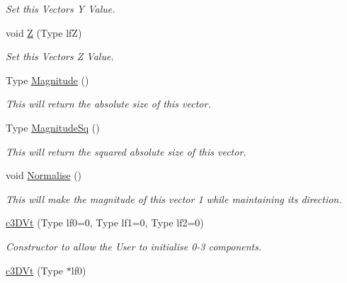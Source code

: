 \begin{DoxyCompactItemize}
\begin{DoxyCompactList}\small\item\em Set this Vectors Y Value. \end{DoxyCompactList}\item 
\hypertarget{classc3_d_vt_a23ad6c598963c1891fad05c6687d3d76}{
void \hyperlink{classc3_d_vt_a23ad6c598963c1891fad05c6687d3d76}{Z} (Type lfZ)}
\label{classc3_d_vt_a23ad6c598963c1891fad05c6687d3d76}

\begin{DoxyCompactList}\small\item\em Set this Vectors Z Value. \end{DoxyCompactList}\item 
\hypertarget{classc3_d_vt_af8df11dbf7dfdf2d5f9379febed52183}{
Type \hyperlink{classc3_d_vt_af8df11dbf7dfdf2d5f9379febed52183}{Magnitude} ()}
\label{classc3_d_vt_af8df11dbf7dfdf2d5f9379febed52183}

\begin{DoxyCompactList}\small\item\em This will return the absolute size of this vector. \end{DoxyCompactList}\item 
\hypertarget{classc3_d_vt_a400d4c58994c0bea04edd265d89dbff9}{
Type \hyperlink{classc3_d_vt_a400d4c58994c0bea04edd265d89dbff9}{MagnitudeSq} ()}
\label{classc3_d_vt_a400d4c58994c0bea04edd265d89dbff9}

\begin{DoxyCompactList}\small\item\em This will return the squared absolute size of this vector. \end{DoxyCompactList}\item 
\hypertarget{classc3_d_vt_ab0596e7c234a2737701a3be5ed985205}{
void \hyperlink{classc3_d_vt_ab0596e7c234a2737701a3be5ed985205}{Normalise} ()}
\label{classc3_d_vt_ab0596e7c234a2737701a3be5ed985205}

\begin{DoxyCompactList}\small\item\em This will make the magnitude of this vector 1 while maintaining its direction. \end{DoxyCompactList}\item 
\hypertarget{classc3_d_vt_ac477f1d395ac545f8e2d2563cd1b4f47}{
\hyperlink{classc3_d_vt_ac477f1d395ac545f8e2d2563cd1b4f47}{c3DVt} (Type lf0=0, Type lf1=0, Type lf2=0)}
\label{classc3_d_vt_ac477f1d395ac545f8e2d2563cd1b4f47}

\begin{DoxyCompactList}\small\item\em Constructor to allow the User to initialise 0-\/3 components. \end{DoxyCompactList}\item 
\hypertarget{classc3_d_vt_aa12012c2fc92268f894b4c50cb58ea29}{
\hyperlink{classc3_d_vt_aa12012c2fc92268f894b4c50cb58ea29}{c3DVt} (Type $\ast$lf0)}
\label{classc3_d_vt_aa12012c2fc92268f894b4c50cb58ea29}


\end{DoxyCompactItemize}
